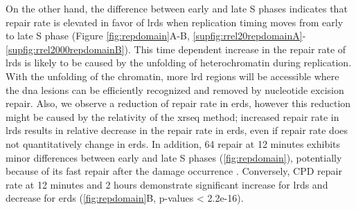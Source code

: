 On the other hand, the difference between early and late S phases indicates that repair rate is elevated in favor of \gls{lrd}s when replication timing moves from early to late S phase (Figure \ref{fig:repdomain}A-B, \ref{supfig:rrel20repdomainA}-\ref{supfig:rrel2000repdomainB}). This time dependent increase in the repair rate of \gls{lrd}s is likely to be caused by the unfolding of heterochromatin during replication. With the unfolding of the chromatin, more \gls{lrd} regions will be accessible where the \gls{dna} lesions can be efficiently recognized and removed by nucleotide excision repair. Also, we observe a reduction of repair rate in \gls{erd}s, however this reduction might be caused by the relativity of the \gls{xrseq} method; increased repair rate in \gls{lrd}s results in relative decrease in the repair rate in \gls{erd}s, even if repair rate does not quantitatively change in \gls{erd}s. In addition, \gls{64} repair at 12 minutes exhibits minor differences between early and late S phases (\ref{fig:repdomain}), potentially because of its fast repair after the damage occurrence \citep{hu2017dynamic}. Conversely, \gls{CPD} repair rate at 12 minutes and 2 hours demonstrate significant increase for \gls{lrd}s and decrease for \gls{erd}s (\ref{fig:repdomain}B, p-values < 2.2e-16). 

